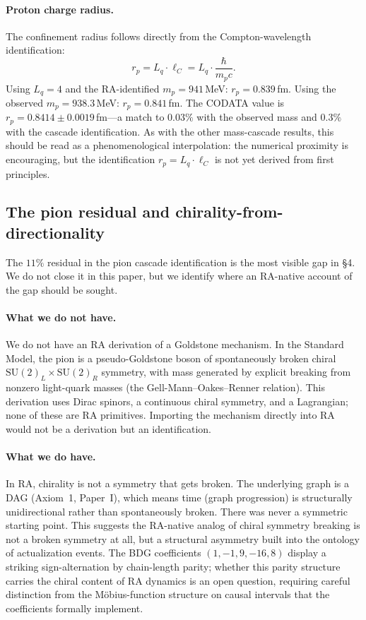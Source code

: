 \documentclass[11pt]{article}
\begin{document}
\paragraph{Proton charge radius.} The confinement radius follows directly from the Compton-wavelength identification:
\begin{equation}
r_p = L_q\cdot\ell_C = L_q\cdot\frac{\hbar}{m_p c}.
\end{equation}
Using $L_q=4$ and the RA-identified $m_p=941$\,MeV: $r_p=0.839$\,fm. Using the observed $m_p=938.3$\,MeV: $r_p=0.841$\,fm. The CODATA value is $r_p=0.8414\pm 0.0019$\,fm---a match to $0.03\%$ with the observed mass and $0.3\%$ with the cascade identification. As with the other mass-cascade results, this should be read as a phenomenological interpolation: the numerical proximity is encouraging, but the identification $r_p=L_q\cdot\ell_C$ is not yet derived from first principles.

\subsection{The pion residual and chirality-from-directionality}

The $11\%$ residual in the pion cascade identification is the most visible gap in \S4. We do not close it in this paper, but we identify where an RA-native account of the gap should be sought.

\paragraph{What we do not have.} We do not have an RA derivation of a Goldstone mechanism. In the Standard Model, the pion is a pseudo-Goldstone boson of spontaneously broken chiral $\mathrm{SU}(2)_L\times\mathrm{SU}(2)_R$ symmetry, with mass generated by explicit breaking from nonzero light-quark masses (the Gell-Mann--Oakes--Renner relation). This derivation uses Dirac spinors, a continuous chiral symmetry, and a Lagrangian; none of these are RA primitives. Importing the mechanism directly into RA would not be a derivation but an identification.

\paragraph{What we do have.} In RA, chirality is not a symmetry that gets broken. The underlying graph is a DAG (Axiom~1, Paper~I), which means time (graph progression) is structurally unidirectional rather than spontaneously broken. There was never a symmetric starting point. This suggests the RA-native analog of chiral symmetry breaking is not a broken symmetry at all, but a structural asymmetry built into the ontology of actualization events. The BDG coefficients $(1,-1,9,-16,8)$ display a striking sign-alternation by chain-length parity; whether this parity structure carries the chiral content of RA dynamics is an open question, requiring careful distinction from the M\"obius-function structure on causal intervals that the coefficients formally implement.
\end{document}
